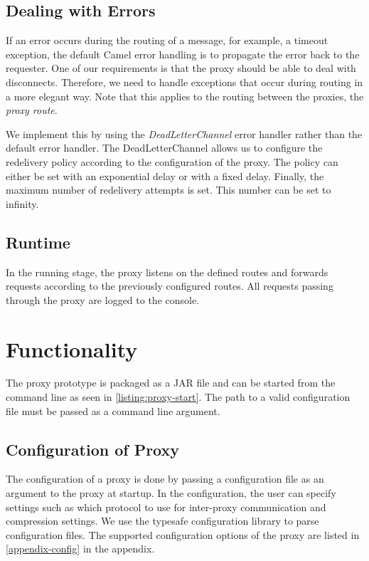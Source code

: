 \subsection{Dealing with Errors}

If an error occurs during the routing of a message, for example, a timeout
exception, the default Camel error handling is to propagate the error back to
the requester. One of our requirements is that the proxy should be able to deal
with disconnects. Therefore, we need to handle exceptions that occur during
routing in a more elegant way. Note that this applies to the routing between the
proxies, the \textit{proxy route}.

We implement this by using the \textit{DeadLetterChannel} error handler rather
than the default error handler. The DeadLetterChannel allows us to configure the
redelivery policy according to the configuration of the proxy. The policy can
either be set with an exponential delay or with a fixed delay. Finally, the
maximum number of redelivery attempts is set. This number can be set to
infinity.

\subsection{Runtime}

In the running stage, the proxy listens on the defined routes and forwards
 requests according to the previously configured routes. All requests passing
 through the proxy are logged to the console.


\section{Functionality}

The proxy prototype is packaged as a JAR file and can be started from the command
line as seen in \cref{listing:proxy-start}. The path to a valid configuration
file must be passed as a command line argument.



\subsection{Configuration of Proxy}
\label{section:proxy-config}

The configuration of a proxy is done by passing a configuration file as an
argument to the proxy at startup. In the configuration, the user can specify
settings such as which protocol to use for inter-proxy communication and
compression settings. We use the typesafe\cite{typesafe-homepage} configuration
library to parse configuration files. The supported configuration options of the
proxy are listed in \cref{appendix-config} in the appendix.

